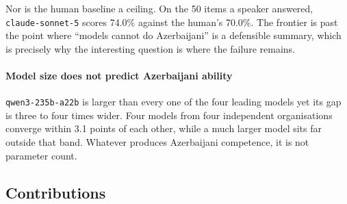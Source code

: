 \documentclass[final]{clv2025}
\begin{document}
Nor is the human baseline a ceiling. On the 50 items a speaker answered,
\texttt{claude-sonnet-5} scores 74.0\% against the human's 70.0\%. The frontier
is past the point where ``models cannot do Azerbaijani'' is a defensible
summary, which is precisely why the interesting question is where the failure
remains.

\paragraph{Model size does not predict Azerbaijani ability}
\texttt{qwen3-235b-a22b} is larger than every one of the four leading models
yet its gap is three to four times wider. Four models from four independent
organisations converge within 3.1 points of each other, while a much larger
model sits far outside that band. Whatever produces Azerbaijani competence, it
is not parameter count.

\subsection{Contributions}
\end{document}
